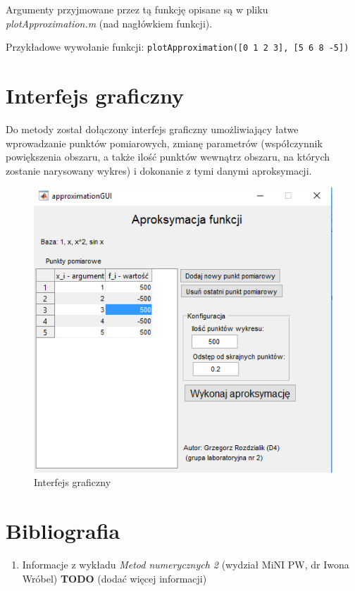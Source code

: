 \documentclass[12pt]{article}
\begin{document}
	Argumenty przyjmowane przez tą funkcję opisane są w pliku \textit{plotApproximation.m} (nad nagłówkiem funkcji).
	
	Przykładowe wywołanie funkcji:
	\texttt{plotApproximation([0 1 2 3], [5 6 8 -5])}
	
	
	\section{Interfejs graficzny}
	Do metody został dołączony interfejs graficzny umożliwiający łatwe wprowadzanie punktów pomiarowych, zmianę parametrów (współczynnik powiększenia obszaru, a także ilość punktów wewnątrz obszaru, na których zostanie narysowany wykres) i dokonanie z tymi danymi aproksymacji.
	
	\begin{figure}[H]
		\centering
		\includegraphics[scale=1]{images/gui.png}
		\caption{Interfejs graficzny}
		\label{GUI}
	\end{figure}
	
	
	
	\section{Bibliografia}
	\begin{enumerate}
		\item Informacje z wykładu \textit{Metod numerycznych 2} (wydział MiNI PW, dr Iwona Wróbel) \textbf{TODO} (dodać więcej informacji)
	\end{enumerate}
	
\end{document}
